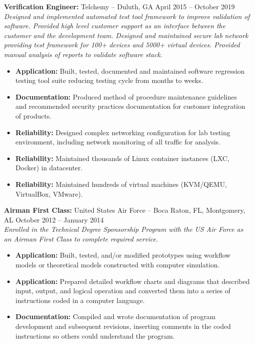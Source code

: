 \documentclass[11pt]{article}
\begin{document}
\begin{description}
\item\textbf{Verification Engineer:} {Telchemy} -- Duluth, GA \hfill April 2015 -- October 2019 \\
\textit{Designed and implemented automated test tool framework to improve validation of software. Provided high level customer support as an interface between the customer and the development team. Designed and maintained secure lab network providing test framework for 100+ devices and 5000+ virtual devices. Provided manual analysis of reports to validate software stack.} \\
\vspace{-6.5pt}
\begin{itemize}
  \item \textbf{Application:} Built, tested, documented and maintained software regression testing tool suite reducing testing cycle from months to weeks.
  \item \textbf{Documentation:} Produced method of procedure maintenance guidelines and recommended security practices documentation for customer integration of products.
  \item \textbf{Reliability:} Designed complex networking configuration for lab testing environment, including network monitoring of all traffic for analysis.
  \item \textbf{Reliability:} Maintained thousands of Linux container instances (LXC, Docker) in datacenter.
  \item \textbf{Reliability:} Maintained hundreds of virtual machines (KVM/QEMU, VirtualBox, VMware).
\end{itemize}
\end{description}

\begin{description}
\item\textbf{Airman First Class:} {United States Air Force} -- Boca Raton, FL, Montgomery, AL \hfill October 2012 -- January 2014 \\
\textit{Enrolled in the Technical Degree Sponsorship Program with the US Air Force as an Airman First Class to complete required service.} \\
\vspace{-6.5pt}
\begin{itemize}
  \item \textbf{Application:} Built, tested, and/or modified prototypes using workflow models or theoretical models constructed with computer simulation.
  \item \textbf{Application:} Prepared detailed workflow charts and diagrams that described input, output, and logical operation and converted them into a series of instructions coded in a computer language.
  \item \textbf{Documentation:} Compiled and wrote documentation of program development and subsequent revisions, inserting comments in the coded instructions so others could understand the program.
\end{itemize}
\end{description}

\vspace{-18.5pt}
\end{document}
